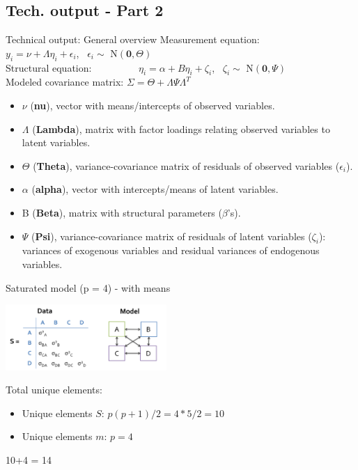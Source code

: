 \documentclass[10pt]{beamer}\usepackage[]{graphicx}\usepackage[]{xcolor}
\begin{document}
\subsection*{Tech. output - Part 2}
%
\begin{frame}{Technical output: General overview}
Measurement equation: \ \ \ \ \ $y_i = \nu + \Lambda \eta_i + \epsilon_i$, \ $\epsilon_i \sim$ N$(\boldsymbol{0}, \Theta)$ \\
\vspace*{2mm}
Structural equation: \ \ \ \ \ \ \ \ \ $\eta_i = \alpha + B \eta_i + \zeta_i$, \ $\zeta_i \sim$ N$(\boldsymbol{0}, \Psi)$ \\
\vspace*{2mm}
Modeled covariance matrix: $\Sigma =  \Theta + \Lambda \Psi \Lambda^T$ \\
\vspace*{2mm}
\begin{itemize}
\item $\nu$ (\textbf{nu}), vector with means/intercepts of observed variables.
\item $\Lambda$ (\textbf{Lambda}), matrix with factor loadings relating observed variables to latent variables.
\item $\Theta$	(\textbf{Theta}), variance-covariance matrix of residuals of observed variables ($\epsilon_i$).
\item $\alpha$ (\textbf{alpha}), vector with intercepts/means of latent variables.
\item B (\textbf{Beta}), matrix with structural parameters ($\beta$'s).
\item $\Psi$ (\textbf{Psi}), variance-covariance matrix of residuals of latent variables ($\zeta_i$): variances of exogenous variables and residual variances of endogenous variables.
\end{itemize}
\end{frame}
%
\begin{frame}{Saturated model (p = 4) - with means}

\includegraphics[height=2.5cm,keepaspectratio=T] {saturated4.png}

\vspace{5mm}

Total unique elements:
\begin{itemize}
\item{Unique elements $S$: $p(p+1)/2 = 4*5/2 = 10$}
\item{Unique elements $m$: $p = 4$}
\end{itemize}
10+4 = 14

\end{frame}
\end{document}
